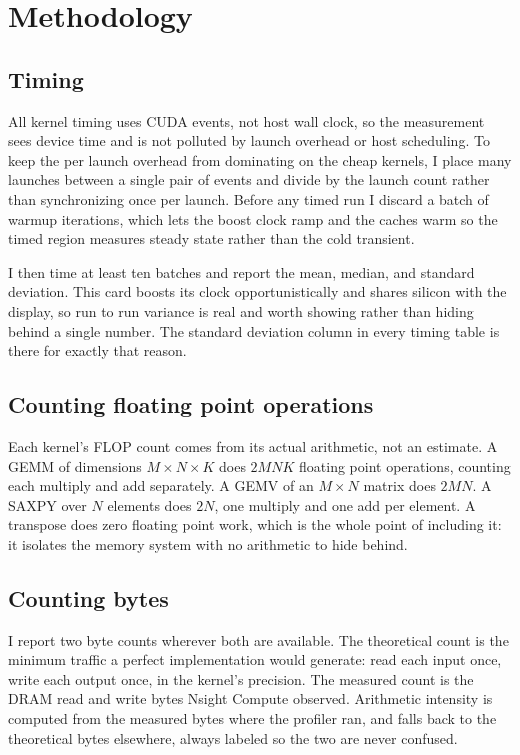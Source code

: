 \section{Methodology}

\subsection{Timing}

All kernel timing uses CUDA events, not host wall clock, so the measurement sees
device time and is not polluted by launch overhead or host scheduling. To keep
the per launch overhead from dominating on the cheap kernels, I place many
launches between a single pair of events and divide by the launch count rather
than synchronizing once per launch. Before any timed run I discard a batch of
warmup iterations, which lets the boost clock ramp and the caches warm so the
timed region measures steady state rather than the cold transient.

I then time at least ten batches and report the mean, median, and standard
deviation. This card boosts its clock opportunistically and shares silicon with
the display, so run to run variance is real and worth showing rather than hiding
behind a single number. The standard deviation column in every timing table is
there for exactly that reason.

\subsection{Counting floating point operations}

Each kernel's FLOP count comes from its actual arithmetic, not an estimate. A
GEMM of dimensions $M \times N \times K$ does $2MNK$ floating point operations,
counting each multiply and add separately. A GEMV of an $M \times N$ matrix does
$2MN$. A SAXPY over $N$ elements does $2N$, one multiply and one add per element.
A transpose does zero floating point work, which is the whole point of including
it: it isolates the memory system with no arithmetic to hide behind.

\subsection{Counting bytes}

I report two byte counts wherever both are available. The theoretical count is
the minimum traffic a perfect implementation would generate: read each input
once, write each output once, in the kernel's precision. The measured count is
the DRAM read and write bytes Nsight Compute observed. Arithmetic intensity is
computed from the measured bytes where the profiler ran, and falls back to the
theoretical bytes elsewhere, always labeled so the two are never confused.


